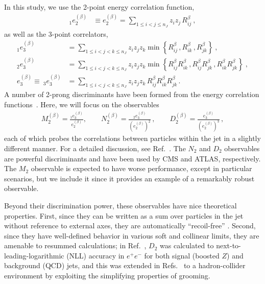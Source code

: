 \documentclass[11pt]{cernrep}
\begin{document}
In this study, we use the 2-point energy correlation function,
\begin{align}\label{jetsub_2prong_eq:explicit_twopointvar}
_1e_2^{(\beta)}&\equiv e_2^{(\beta)}=\sum_{1\leq i<j\leq n_J} z_{i}z_{j} \, R_{ij}^\beta\ ,
\end{align}
as well as the 3-point correlators,
\begin{align}\label{jetsub_2prong_eq:explicit_ecfvar}
_1e_{3}^{(\beta)}&=\sum_{1\leq i<j<k\leq n_J} z_{i}z_{j}z_{k} \min \left\{ R_{ij}^\beta\,,  R_{ik}^\beta\,, R_{jk}^\beta  \right\} \ , \nonumber \\
_2e_{3}^{(\beta)}&=\sum_{1\leq i<j<k\leq n_J} z_{i}z_{j}z_{k} \min \left\{R_{ij}^\beta R_{ik}^\beta\,, R_{ij}^\beta  R_{jk}^\beta\,,     R_{ik}^\beta R_{jk}^\beta    \right\}  \ , \nonumber \\
e_{3}^{(\beta)}\equiv ~_3e_{3}^{(\beta)}&=\sum_{1\leq i<j<k\leq n_J} z_{i}z_{j}z_{k} \, R_{ij}^\beta R_{ik}^\beta R_{jk}^\beta \,.
\end{align}
%
A number of 2-prong discriminants have been formed from the energy correlation functions~\cite{Larkoski:2013eya,Larkoski:2014gra,Larkoski:2014zma,Moult:2016cvt}.  Here, we will focus on the observables
\begin{align}
 M_2^{(\beta)} = \frac{_1e_{3}^{(\beta)}}{e_{2}^{(\beta)}}, \qquad  N_2^{(\beta)} = \frac{_2e_{3}^{(\beta)}}{(e_{2}^{(\beta)})^2}\,, \qquad  D_{2}^{(\beta)}=\frac{e_{3}^{(\beta)}}{(e_{2}^{(\beta)})^{3}}\,, 
\end{align}
each of which probes the correlations between particles within the jet in a slightly different manner.
%
For a detailed discussion, see Ref.~\cite{Moult:2016cvt}.
%
The $N_2$ and $D_2$ observables are powerful discriminants and have
been used by CMS and ATLAS, respectively.
%
The $M_2$ observable is expected to have worse performance, except in particular scenarios, but we include it since it provides an example of a remarkably robust observable.

Beyond their discrimination power, these observables have nice theoretical properties.
%
First, since they can be written as a sum over particles in the jet without reference to external axes, they are automatically ``recoil-free'' \cite{Catani:1992jc,Dokshitzer:1998kz,Banfi:2004yd,Larkoski:2013eya,Larkoski:2014uqa}.
%
Second, since they have well-defined behavior in various soft and collinear limits, they are amenable to resummed calculations;  in Ref.~\cite{Larkoski:2015kga}, $D_2$ was calculated to next-to-leading-logarithmic (NLL) accuracy in $e^+e^-$ for both signal (boosted $Z$) and background (QCD) jets, and this was extended in Refs.~\cite{Larkoski:2017iuy,Larkoski:2017cqq} to a hadron-collider environment by exploiting the simplifying properties of grooming.
\end{document}
